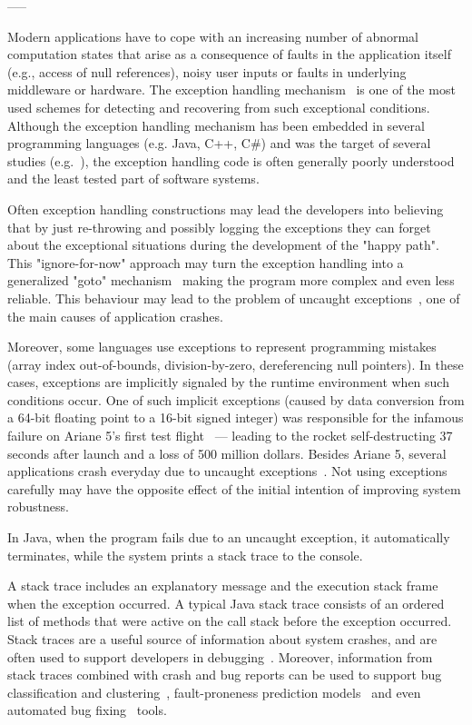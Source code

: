\documentclass[conference]{IEEEtran}
\begin{document}
-----

Modern applications have to cope with an increasing number of abnormal
computation states that arise as a consequence of faults in the application
itself (e.g., access of null references), noisy user inputs or faults in
underlying middleware or hardware. The exception handling
mechanism~\cite{goodenough1975exception} is one of the most used schemes for
detecting and recovering from such exceptional conditions. Although the
exception handling mechanism has been embedded in several programming languages
(e.g. Java, C++, C\#) and was the target of several studies
(e.g.~\cite{miller1997issues,Robil00,shah2010understanding,
garcia2007extracting,garcia2001comparative,cabral2007exception,coelho2011unveiling}),
the exception handling code is often generally poorly understood and the least
tested part of software systems.

Often exception handling constructions may lead the developers into believing that
by just re-throwing and possibly logging the exceptions they can forget about the exceptional
situations during the development of the "happy path". This "ignore-for-now"
approach may turn the exception handling into a generalized "goto"
mechanism~\cite{mandrioli1992advances} making the program more complex and even
less reliable. This behaviour may lead to the problem of uncaught exceptions~\cite{jo2004uncaught}, one of the main causes of application crashes.

Moreover, some languages use exceptions to represent programming mistakes
(array index out-of-bounds, division-by-zero, dereferencing null pointers). In these cases,
exceptions are implicitly signaled by the runtime environment when such
conditions occur. One of such implicit exceptions (caused by data conversion
from a 64-bit floating point to a 16-bit signed integer) was responsible for
the infamous failure on Ariane 5's first test flight~\cite{lions1996ariane} ---
leading to the rocket self-destructing 37 seconds after launch and a loss of 500
million dollars. Besides Ariane 5, several applications crash everyday due to
uncaught exceptions~\cite{jo2004uncaught}. Not using exceptions carefully
may have the opposite effect of the initial intention of improving
system robustness.

In Java, when the program fails due to an uncaught exception, it automatically
terminates, while the system prints a stack trace to the console. 

A stack trace
includes an explanatory message and the execution stack frame when the exception
occurred. A typical Java stack trace consists of an ordered list of methods that
were active on the call stack before the exception occurred. Stack traces
are a useful source of information about system crashes, and are often used to
support developers in debugging~\cite{schroter2010stack}. Moreover, information
from stack traces combined with crash and bug reports can be used to support bug
classification and clustering~\cite{wang2013improving, kim2011crash,
dhaliwal2011classifying}, fault-proneness prediction
models~\cite{kim2013predicting} and even automated bug
fixing~\cite{sinha2009fault} tools.
\end{document}
